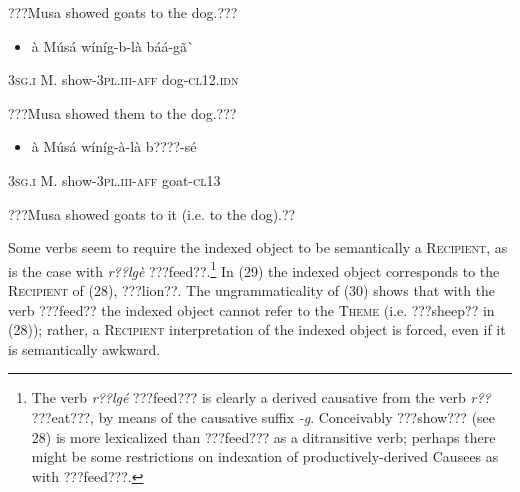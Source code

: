 \documentclass[output=paper]{langsci/langscibook}
\begin{document}
{{\begin{styleTranslation}
???Musa showed goats to the dog.???
\end{styleTranslation}

\begin{itemize}
\item \begin{styleNumberedEX}
\`{a}    M\'{u}s\'{a}  w\'{i}n\'{i}g-b-l\`{a}    b\'{a}\'{a}-g\~{a}\`{ }
\end{styleNumberedEX}\end{itemize}
\begin{styleGloss}
\textsc{3sg.i    }M.  show-\textsc{3pl.iii-aff}  dog-\textsc{cl12.idn}
\end{styleGloss}

\begin{styleTranslation}
???Musa showed them to the dog.???  
\end{styleTranslation}

\begin{itemize}
\item \begin{styleNumberedEX}
\label{bkm:Ref424317424}\`{a}    M\'{u}s\'{a}  w\'{i}n\'{i}g-\`{a}-l\`{a}    b????-s\'{e}
\end{styleNumberedEX}\end{itemize}
\begin{styleGloss}
\textsc{3sg.i  }  M.  show-\textsc{3pl.iii-aff}  goat-\textsc{cl13}
\end{styleGloss}

\begin{styleTranslation}
???Musa showed goats to it (i.e. to the dog).??
\end{styleTranslation}

Some verbs seem to require the indexed object to be semantically a \textsc{Recipient}, as is the case with \textit{r??lg\`{e}} ???feed??.\footnote{ The verb \textit{r??lg\'{e}} ???feed??? is clearly a derived causative from the verb \textit{r??} ???eat???, by means of the causative suffix \textit{{}-g}. Conceivably ???show??? (see 28) is more lexicalized than ???feed??? as a ditransitive verb; perhaps there might be some restrictions on indexation of productively-derived Causees as with ???feed???.}{ }In (29) the indexed object corresponds to the \textsc{Recipient} of (28), ???lion??. The ungrammaticality of (30) shows that with the verb ???feed?? the indexed object cannot refer to the \textsc{Theme} (i.e. ???sheep?? in (28)); rather, a \textsc{Recipient} interpretation of the indexed object is forced, even if it is semantically awkward.

}}
\end{document}

